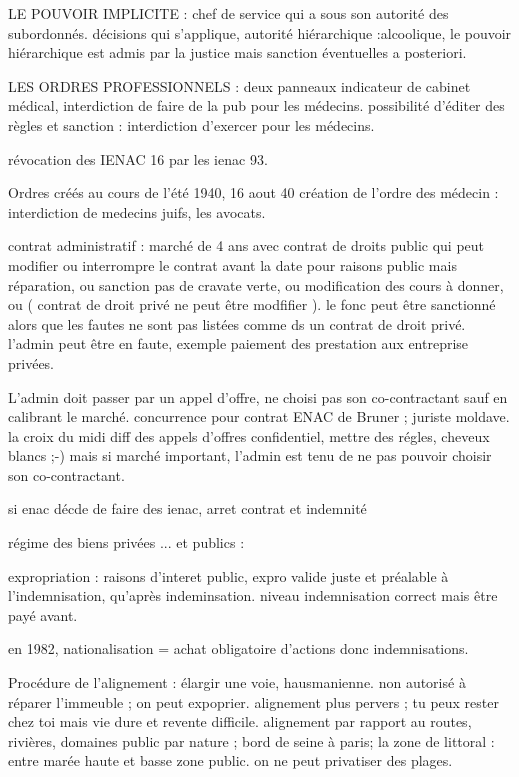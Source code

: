 \documentclass[a4paper,12pt]{article}
\begin{document}
LE POUVOIR IMPLICITE : chef de service qui a sous son autorité des subordonnés. décisions qui s'applique, autorité hiérarchique :alcoolique, le pouvoir hiérarchique est admis par la justice mais sanction éventuelles a posteriori.

LES ORDRES PROFESSIONNELS :
deux panneaux indicateur de cabinet médical, interdiction de faire de la pub pour les médecins.
possibilité d'éditer des règles et sanction : interdiction d'exercer pour les médecins.

révocation des IENAC 16 par les ienac 93.

Ordres créés au cours de l'été 1940, 16 aout 40 création de l'ordre des médecin : interdiction de medecins juifs,
les avocats.

contrat administratif : marché de 4 ans avec contrat de droits public qui peut modifier ou interrompre le contrat avant la date pour raisons public mais réparation, ou sanction pas de cravate verte, ou modification des cours à donner, ou  ( contrat de droit privé ne peut être modfifier ). le fonc peut être sanctionné alors que les fautes ne sont pas listées comme ds un contrat de droit privé. l'admin peut être en faute, exemple paiement des prestation aux entreprise privées.


L'admin doit passer par un appel d'offre, ne choisi pas son co-contractant sauf en calibrant le marché.
concurrence pour contrat ENAC de Bruner ; juriste moldave. la croix du midi diff des appels d'offres confidentiel, mettre
des régles, cheveux blancs ;-)
mais si marché important, l'admin est tenu de ne pas pouvoir choisir son co-contractant.

si enac décde de faire des ienac, arret contrat et indemnité

régime des biens privées ... et publics :

expropriation : raisons d'interet public, expro valide juste et préalable à l'indemnisation, qu'après indeminsation.
niveau indemnisation correct mais être payé avant.

en 1982, nationalisation = achat obligatoire d'actions donc indemnisations.

Procédure de l'alignement : élargir une voie, hausmanienne. non autorisé à réparer l'immeuble ; on peut expoprier.
alignement plus pervers ; tu peux rester chez toi mais vie dure et revente difficile. alignement par rapport au routes, rivières, domaines public par nature ; bord de seine à paris; la zone de littoral : entre marée haute et basse zone public. on ne peut privatiser des plages.
\end{document}
